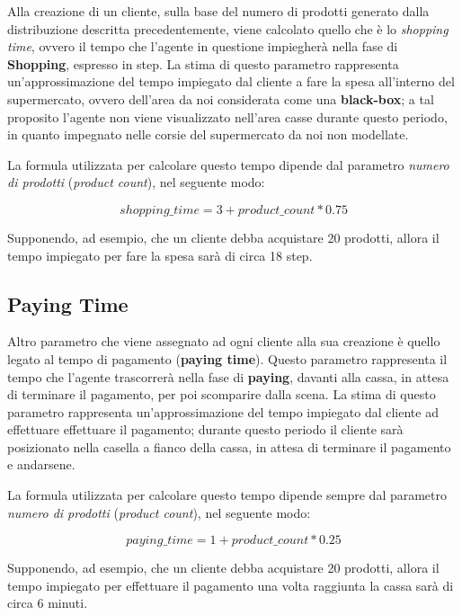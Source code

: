 Alla creazione di un cliente, sulla base del numero di prodotti generato dalla distribuzione descritta precedentemente, viene calcolato quello che è lo \textit{shopping time}, ovvero il tempo che l'agente in questione impiegherà nella fase di \textbf{Shopping}, espresso in step. La stima di questo parametro rappresenta un'approssimazione del tempo impiegato dal cliente a fare la spesa all'interno del supermercato, ovvero dell'area da noi considerata come una \textbf{black-box}; a tal proposito l'agente non viene visualizzato nell'area casse durante questo periodo, in quanto impegnato nelle corsie del supermercato da noi non modellate. 

La formula utilizzata per calcolare questo tempo dipende dal parametro \textit{numero di prodotti} (\textit{product count}), nel seguente modo: 

\begin{equation*}
shopping\_time = 3 + product\_count * 0.75
\end{equation*}

Supponendo, ad esempio, che un cliente debba acquistare 20 prodotti, allora il tempo impiegato per fare la spesa sarà di circa 18 step.

\subsection{Paying Time}

Altro parametro che viene assegnato ad ogni cliente alla sua creazione è quello legato al tempo di pagamento (\textbf{paying time}). Questo parametro rappresenta il tempo che l'agente trascorrerà nella fase di \textbf{paying}, davanti alla cassa, in attesa di terminare il pagamento, per poi scomparire dalla scena. La stima di questo parametro rappresenta un'approssimazione del tempo impiegato dal cliente ad effettuare effettuare il pagamento; durante questo periodo il cliente sarà posizionato nella casella a fianco della cassa, in attesa di terminare il pagamento e andarsene. 

La formula utilizzata per calcolare questo tempo dipende sempre dal parametro \textit{numero di prodotti} (\textit{product count}), nel seguente modo:

\begin{equation*}
paying\_time = 1 + product\_count * 0.25
\end{equation*}

Supponendo, ad esempio, che un cliente debba acquistare 20 prodotti, allora il tempo impiegato per effettuare il pagamento una volta raggiunta la cassa sarà di circa 6 minuti.

